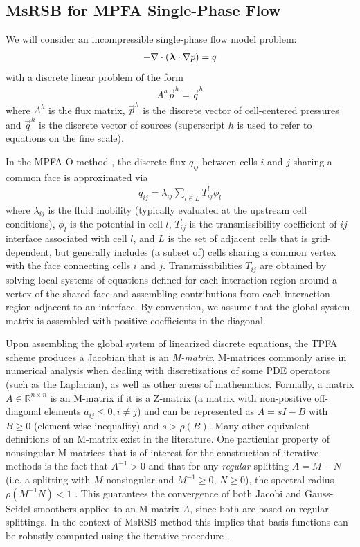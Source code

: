 \subsection{MsRSB for MPFA Single-Phase Flow}
\label{subsec:enhanced_msrsb_flow}

We will consider an incompressible single-phase flow model problem:
\begin{align}
    - \nabla \cdot \left(\bm{\lambda} \cdot \nabla p\right) = q
\end{align}
with a discrete linear problem of the form
\begin{align}
    A^h\vec{p}^h = \vec{q}^h
\end{align}
where $A^h$ is the flux matrix, $\vec{p}^h$ is the discrete vector of cell-centered pressures and $\vec{q}^h$ is the discrete vector of sources (superscript $h$ is used to refer to equations on the fine scale).

In the MPFA-O method \cite{Aavatsmark2002}, the discrete flux $q_{ij}$ between cells $i$ and $j$ sharing a common face is approximated via
\begin{align}
    q_{ij} = \lambda_{ij}\sum\limits_{l \in L} T_{ij}^l \phi_l
\end{align}
where $\lambda_{ij}$ is the fluid mobility (typically evaluated at the upstream cell conditions), $\phi_l$ is the potential in cell $l$, $T_{ij}^l$ is the transmissibility coefficient of $ij$ interface associated with cell $l$, and $L$ is the set of adjacent cells that is grid-dependent, but generally includes (a subset of) cells sharing a common vertex with the face connecting cells $i$ and $j$.   Transmissibilities $T_{ij}$ are obtained by solving local systems of equations defined for each interaction region around a vertex of the shared face and assembling contributions from each interaction region adjacent to an interface.   By convention, we assume that the global system matrix is assembled with positive coefficients in the diagonal.

Upon assembling the global system of linearized discrete equations, the TPFA scheme produces a Jacobian that is an \textit{M-matrix}.   M-matrices commonly arise in numerical analysis when dealing with discretizations of some PDE operators (such as the Laplacian), as well as other areas of mathematics.   Formally, a matrix $A \in \mathbb{R}^{n \times n}$ is an M-matrix if it is a Z-matrix (a matrix with non-positive off-diagonal elements $a_{ij} \leq 0, i \neq j$) and can be represented as $A = sI - B$ with $B \geq 0$ (element-wise inequality) and $s > \rho(B)$.   Many other equivalent definitions of an M-matrix exist in the literature.   One particular property of nonsingular M-matrices that is of interest for the construction of iterative methods is the fact that $A^{-1} > 0$ and that for any \textit{regular} splitting $A = M - N$ (i.e. a splitting with $M$ nonsingular and $M^{-1} \geq 0$, $N \geq 0$), the spectral radius $\rho(M^{-1}N) < 1$ \cite{Saad2003}.   This guarantees the convergence of both Jacobi and Gauss-Seidel smoothers applied to an M-matrix $A$, since both are based on regular splittings.   In the context of MsRSB method this implies that basis functions can be robustly computed using the iterative procedure .

